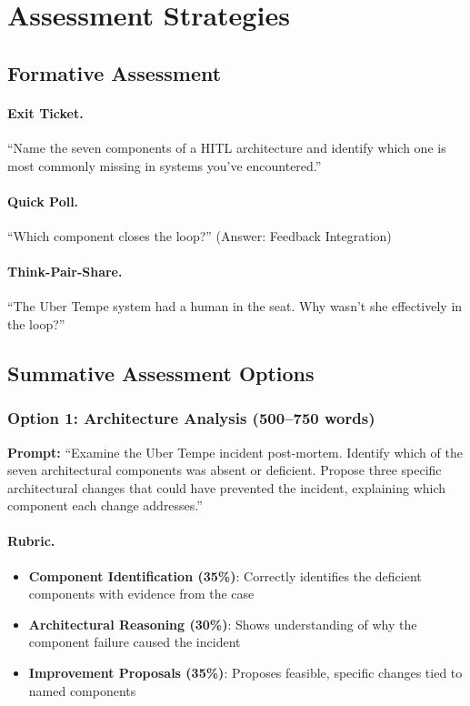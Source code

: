 \section{Assessment Strategies}

\subsection{Formative Assessment}

\paragraph{Exit Ticket.}
``Name the seven components of a HITL architecture and identify which one is most commonly missing in systems you've encountered.''

\paragraph{Quick Poll.}
``Which component closes the loop?'' (Answer: Feedback Integration)

\paragraph{Think-Pair-Share.}
``The Uber Tempe system had a human in the seat. Why wasn't she effectively in the loop?''

\subsection{Summative Assessment Options}

\subsubsection{Option 1: Architecture Analysis (500--750 words)}

\textbf{Prompt:} ``Examine the Uber Tempe incident post-mortem. Identify which of the seven architectural components was absent or deficient. Propose three specific architectural changes that could have prevented the incident, explaining which component each change addresses.''

\paragraph{Rubric.}
\begin{itemize}
    \item \textbf{Component Identification (35\%)}: Correctly identifies the deficient components with evidence from the case
    \item \textbf{Architectural Reasoning (30\%)}: Shows understanding of why the component failure caused the incident
    \item \textbf{Improvement Proposals (35\%)}: Proposes feasible, specific changes tied to named components
\end{itemize}

